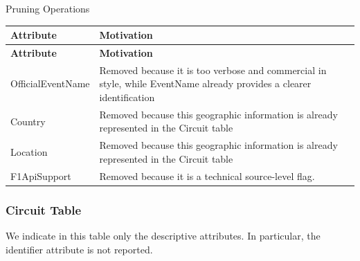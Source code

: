 \documentclass[a4paper,11pt]{article}
\begin{document}
	Pruning Operations
	
	\begin{longtable}{|p{4.4cm}|p{10.8cm}|}
		\hline
		\textbf{Attribute} & \textbf{Motivation} \\
		\hline
		\endfirsthead
		
		\hline
		\textbf{Attribute} & \textbf{Motivation} \\
		\hline
		\endhead
		
		OfficialEventName & Removed because it is too verbose and commercial in style, while EventName already provides a clearer  identification \\ \hline
		
		Country & Removed because this geographic information is already represented in the Circuit table \\ \hline
		
		Location & Removed because this geographic information is already represented in the Circuit table  \\ \hline
		
		F1ApiSupport & Removed because it is a technical source-level flag. \\ \hline
		
	\end{longtable}
	
	
	
	\subsubsection{Circuit Table}
	
	We indicate in this table only the descriptive attributes. In particular, the identifier attribute is not reported.
	
\end{document}
